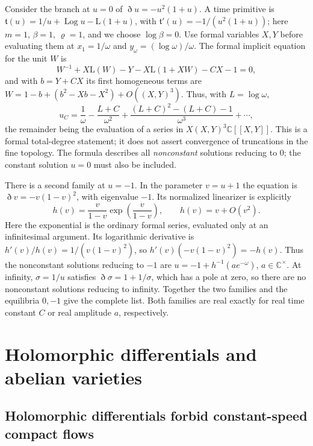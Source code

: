 \documentclass[11pt,letterpaper]{article}
\numberwithin{equation}{section}
\theoremstyle{definition}
\theoremstyle{remark}
\newcommand{\C}{\mathbb C}
\newcommand{\Lmm}{\mathrm{L}}
\newcommand{\Dn}{\eth}
\newcommand{\Log}{\operatorname{Log}}
\begin{document}
\begin{example}
\label{diff:aut:ex:logcorrection}
Consider the branch at $u=0$ of $\Dn u=-u^{2}(1+u)$. A time primitive is
$\mathfrak t(u)=1/u+\Log u-\Lmm(1+u)$, with $\mathfrak t'(u)=-1/(u^{2}(1+u))$;
here $m=1$, $\beta=1$, $\varrho=1$, and we choose $\log\beta=0$.
Use formal variables $X,Y$ before evaluating them at
$x_1=1/\omega$ and $y_\omega=(\log\omega)/\omega$.
The formal implicit equation for the unit $W$ is
\[
 W^{-1}+X\Lmm(W)-Y-X\Lmm(1+XW)-CX-1=0,
\]
and with $b=Y+CX$ its first homogeneous terms are
$W=1-b+(b^{2}-Xb-X^{2})+O((X,Y)^{3})$. Thus, with $L=\log\omega$,
\[
 u_{C}=\frac1\omega-\frac{L+C}{\omega^{2}}+\frac{(L+C)^{2}-(L+C)-1}{\omega^{3}}
 +\cdots,
\]
the remainder being the evaluation of a series in
$X(X,Y)^3\C[[X,Y]]$. This is a formal total-degree statement;
it does not assert convergence of truncations in the fine topology.
The formula describes all \emph{nonconstant} solutions reducing to
$0$; the constant solution $u=0$ must also be included.

There is a second family at $u=-1$. In the parameter $v=u+1$ the
equation is $\Dn v=-v(1-v)^2$, with eigenvalue $-1$.
Its normalized linearizer is explicitly
\[
 h(v)=\frac{v}{1-v}\exp\!\left(\frac{v}{1-v}\right),
 \qquad h(v)=v+O(v^2).
\]
Here the exponential is the ordinary formal series, evaluated only
at an infinitesimal argument. Its logarithmic derivative is
$h'(v)/h(v)=1/(v(1-v)^2)$, so $h'(v)(-v(1-v)^2)=-h(v)$.
Thus the nonconstant solutions reducing to $-1$ are
$u=-1+h^{-1}(a e^{-\omega})$, $a\in\C^\times$.
At infinity, $\sigma=1/u$ satisfies
$\Dn\sigma=1+1/\sigma$, which has a pole at zero, so there are
no nonconstant solutions reducing to infinity. Together the two
families and the equilibria $0,-1$ give the complete list.
Both families are real exactly for real time constant $C$ or
real amplitude $a$, respectively.
\end{example}

\section{Holomorphic differentials and abelian varieties}
\label{diff:aut:sec:abelian}

\subsection{Holomorphic differentials forbid constant-speed compact flows}
\label{diff:aut:sub:holomorphic}
\end{document}
